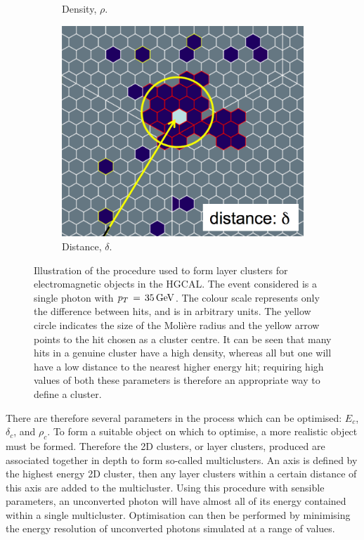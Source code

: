 \begin{figure}[h!]
\begin{subfigure}{0.292\textwidth}
    \caption{Density, $\rho$.}
  \end{subfigure}
  \begin{subfigure}{0.3\textwidth}
    \includegraphics[width=\textwidth]{Figures/HGCAL/ClusteringAlgo_Distance.png}
    \caption{Distance, $\delta$.}
  \end{subfigure}
  \caption[Illustration of the imagine algorithm used for HGCAL layer clustering.]
  {
    Illustration of the procedure used to form layer clusters for electromagnetic objects in the HGCAL.
    The event considered is a single photon with $p_T\,=\,\SI{35}{GeV}$.
    The colour scale represents only the difference between hits, and is in arbitrary units.
    The yellow circle indicates the size of the Moli\`ere radius
    and the yellow arrow points to the hit chosen as a cluster centre.
    It can be seen that many hits in a genuine cluster have a high density, 
    whereas all but one will have a low distance to the nearest higher energy hit;
    requiring high values of both these parameters is therefore an appropriate way to define a cluster.
  }
  \label{fig:hgcal_clustering}
\end{figure}

There are therefore several parameters in the process which can be optimised: $E_c$, $\delta_c$, and $\rho_c$.
To form a suitable object on which to optimise, a more realistic object must be formed.
Therefore the 2D clusters, or layer clusters, produced are associated together in depth to form so-called multiclusters. 
An axis is defined by the highest energy 2D cluster, then any layer clusters within a certain distance of this axis are added to the multicluster.
Using this procedure with sensible parameters, an unconverted photon will have almost all of its energy contained within a single multicluster.
Optimisation can then be performed by minimising the energy resolution of unconverted photons simulated at a range of \pt values.

